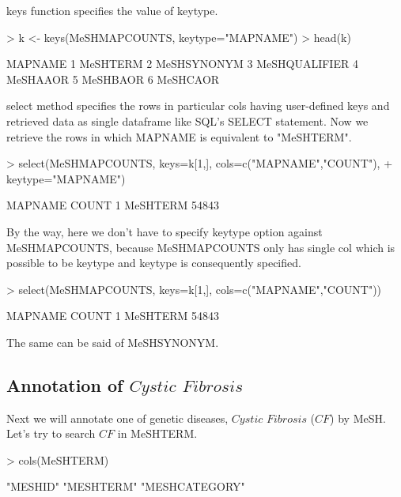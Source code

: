 \documentclass[11pt]{article}
\begin{document}
\newpage
keys function specifies the value of keytype.
\begin{center}
\begin{Schunk}
\begin{Sinput}
> k <- keys(MeSHMAPCOUNTS, keytype="MAPNAME")
> head(k)
\end{Sinput}
\begin{Soutput}
        MAPNAME
1      MeSHTERM
2   MeSHSYNONYM
3 MeSHQUALIFIER
4      MeSHAAOR
5      MeSHBAOR
6      MeSHCAOR
\end{Soutput}
\end{Schunk}
\end{center}


select method specifies the rows in particular cols having user-defined keys and retrieved data as single dataframe like SQL's SELECT statement. Now we retrieve the rows in which MAPNAME is equivalent to "MeSHTERM".
\begin{center}
\begin{Schunk}
\begin{Sinput}
> select(MeSHMAPCOUNTS, keys=k[1,], cols=c("MAPNAME","COUNT"),
+        keytype="MAPNAME")
\end{Sinput}
\begin{Soutput}
   MAPNAME COUNT
1 MeSHTERM 54843
\end{Soutput}
\end{Schunk}
\end{center}


By the way, here we don't have to specify keytype option against MeSHMAPCOUNTS, because MeSHMAPCOUNTS only has single col which is possible to be keytype and keytype is consequently specified.
\begin{center}
\begin{Schunk}
\begin{Sinput}
> select(MeSHMAPCOUNTS, keys=k[1,], cols=c("MAPNAME","COUNT"))
\end{Sinput}
\begin{Soutput}
   MAPNAME COUNT
1 MeSHTERM 54843
\end{Soutput}
\end{Schunk}
\end{center}
The same can be said of MeSHSYNONYM.

\newpage
\subsection{Annotation of $Cystic$ $Fibrosis$}


Next we will annotate one of genetic diseases, $Cystic$ $Fibrosis$ ($CF$) by MeSH. Let's try to search $CF$ in MeSHTERM.
\begin{center}
\begin{Schunk}
\begin{Sinput}
> cols(MeSHTERM)
\end{Sinput}
\begin{Soutput}
[1] "MESHID"       "MESHTERM"     "MESHCATEGORY"
\end{Soutput}
\end{Schunk}
\end{center}
\end{document}
